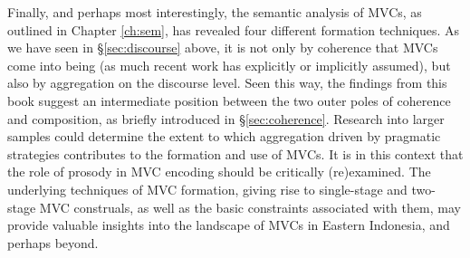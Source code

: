 Finally, and perhaps most interestingly, the semantic analysis of MVCs, as outlined in Chapter \ref{ch:sem}, has revealed four different formation techniques. As we have seen in §\ref{sec:discourse} above, it is not only by coherence that MVCs come into being (as much recent work has explicitly or implicitly assumed), but also by aggregation on the discourse level. Seen this way, the findings from this book suggest an intermediate position between the two outer poles of coherence and composition, as briefly introduced in §\ref{sec:coherence}. Research into larger samples could determine the extent to which aggregation driven by pragmatic strategies contributes to the formation and use of MVCs. It is in this context that the role of prosody in MVC encoding should be critically (re)examined. The underlying techniques of MVC formation, giving rise to single-stage and two-stage MVC construals, as well as the basic constraints associated with them, may provide valuable insights into the landscape of MVCs in Eastern Indonesia, and perhaps beyond.
